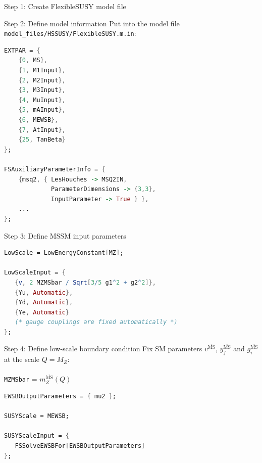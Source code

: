 \documentclass[hyperref={pdfpagelabels=false},ngerman]{beamer}
\newcommand{\MSbar}{\ensuremath{\overline{\text{MS}}}}
\begin{document}
\begin{frame}{Step 1: Create FlexibleSUSY model file}
  \usebox{\listbox}
\end{frame}

\begin{frame}{Step 2: Define model information}
  Put into the model file
  \lstinline{model_files/HSSUSY/FlexibleSUSY.m.in}:
  \\[2em]
  \usebox{\listboxt}
\end{frame}

\begin{lrbox}{\listbox}\begin{lstlisting}[language=Mathematica]
EXTPAR = {
    {0, MS},
    {1, M1Input},
    {2, M2Input},
    {3, M3Input},
    {4, MuInput},
    {5, mAInput},
    {6, MEWSB},
    {7, AtInput},
    {25, TanBeta}
};

FSAuxiliaryParameterInfo = {
    {msq2, { LesHouches -> MSQ2IN,
             ParameterDimensions -> {3,3},
             InputParameter -> True } },
    ...
};
\end{lstlisting}\end{lrbox}

\begin{frame}{Step 3: Define MSSM input parameters}
  \usebox{\listbox}
\end{frame}

\begin{lrbox}{\listbox}\begin{lstlisting}[language=Mathematica]
LowScale = LowEnergyConstant[MZ];

LowScaleInput = {
   {v, 2 MZMSbar / Sqrt[3/5 g1^2 + g2^2]},
   {Yu, Automatic},
   {Yd, Automatic},
   {Ye, Automatic}
   (* gauge couplings are fixed automatically *)
};
\end{lstlisting}\end{lrbox}

\begin{frame}{Step 4: Define low-scale boundary condition}
  Fix SM parameters $v^{\MSbar}$, $y_f^{\MSbar}$ and $g_i^{\MSbar}$ at the scale $Q = M_Z$:\\[2em]
  \usebox{\listbox}
  \\[1em]
  \lstinline{MZMSbar} = $m_Z^{\MSbar}(Q)$
\end{frame}

\begin{lrbox}{\listbox}\begin{lstlisting}[language=Mathematica]
EWSBOutputParameters = { mu2 };

SUSYScale = MEWSB;

SUSYScaleInput = {
   FSSolveEWSBFor[EWSBOutputParameters]
};
\end{lstlisting}\end{lrbox}
\end{document}
